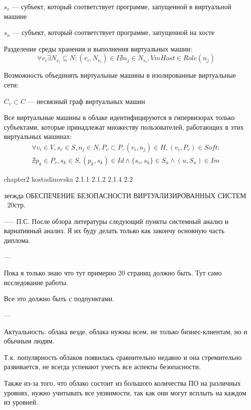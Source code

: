 $s_v$ --- субъект, который соответствует программе, запущенной в виртуальной машине

$s_n$ --- субъект, который соответствует программе, запущенной на хосте

Разделение среды хранения и выполнения виртуальных машин:
\begin{equation}
\forall v_i \exists N_{v_i} \subseteq N :
(v_i, N_{v_i}) \in I \nexists n_j \in N_{v_i}, VmHost \in Role(n_j)
\end{equation}

Возможность объединять виртуальные машины в изолированные виртуальные сети:

$C_v \subset C$ --- несвязный граф виртуальных машин

Все виртуальные машины в облаке идентифицируются в гипервизорах только субъектами, которые принадлежат множеству пользователей, работающих в этих виртуальных машинах:
\begin{multline}
\forall v_i \in V, s_v \in S, n_j \in N, P_v \subset P, (v_i, n_j) \in H, (v_i, P_v) \in Soft : \\
\nexists p_k \in P_v, s_k \in S, (p_k, s_k) \in Id  \wedge \{s_v, s_k\} \in S_u \wedge (u, S_u) \in Im
\end{multline}
\fi

\iffalse
chapter2 kostadinovska
2.1.1
2.1.2
2.1.4
2.2

зегжда ОБЕСПЕЧЕНИЕ БЕЗОПАСНОСТИ
ВИРТУАЛИЗИРОВАННЫХ СИСТЕМ
~20стр.


-----
П.С.
После обзора литературы следующий пункты системный анализ и вариативный анализ.
Я их буду делать только как закончу основную часть диплома.

---

Пока я только знаю что тут примерно 20 страниц должно быть. Тут само исследование работы.

Все это должно быть с подпунктами.


---

Актуальность: облака везде, облака нужны всем, не только бизнес-клиентам, но и обычным людям.

Т.к. популярность облаков появилась сравнительно недавно и она стремительно развивается, не всегда успевают учесть все аспекты безопасности.

Также из-за того, что облако состоит из большого количества ПО на различных уровнях, нужно учитывать все уязвимости, так как они могут всплыть на каждом из уровней.


